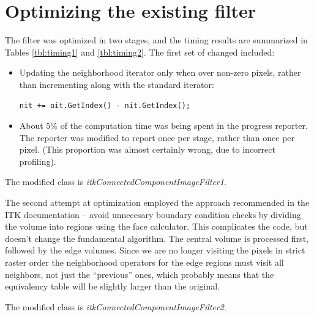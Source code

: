 \documentclass{InsightArticle}
\begin{document}
\section{Optimizing the existing filter}
The filter was optimized in two stages, and the timing results are
summarized in Tables \ref{tbl:timing1} and \ref{tbl:timing2}. The
first set of changed included:
\begin{itemize}
\item Updating the neighborhood iterator only when over non-zero pixels,
      rather than incrementing along with the standard iterator:
\begin{lstlisting}
nit += oit.GetIndex() - nit.GetIndex(); 
\end{lstlisting}

\item About 5\% of the computation time was being spent in the 
progress reporter. The reporter was modified to report once per stage,
rather than once per pixel. (This proportion was almost certainly
wrong, due to incorrect profiling).
\end{itemize}



The modified class is {\em itkConnectedComponentImageFilter1}.

The second attempt at optimization employed the approach recommended
in the ITK documentation -- avoid unnecesary boundary condition checks
by dividing the volume into regions using the face calculator. This
complicates the code, but doesn't change the fundamental
algorithm. The central volume is processed first, followed by the edge
volumes. Since we are no longer visiting the pixels in strict raster
order the neighborhood operators for the edge regions must visit all
neighbors, not just the ``previous'' ones, which probably means that
the equivalency table will be slightly larger than the original.



The modified class is {\em itkConnectedComponentImageFilter2}.
\end{document}
